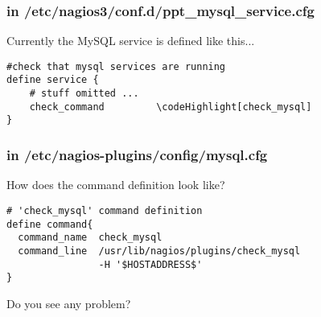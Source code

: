 \documentclass[10pt]{beamer}
\newcommand\codeHighlight[1]{\textcolor[rgb]{1,0,0}{\textbf{#1}}}
\begin{document}
\begin{frame}[fragile]
  \frametitle{in /etc/nagios3/conf.d/ppt\_mysql\_service.cfg}

Currently the MySQL service is defined like this...

\vspace{0.5cm}

\begin{Verbatim}[commandchars=\\\[\]]
#check that mysql services are running
define service {
    # stuff omitted ...
    check_command         \codeHighlight[check_mysql]
}

\end{Verbatim}
\end{frame}


\begin{frame}[fragile]
  \frametitle{in /etc/nagios-plugins/config/mysql.cfg}
  
How does the command definition look like?

\vspace{0.5cm}

\begin{Verbatim}[commandchars=\\\[\]]
# 'check_mysql' command definition
define command{
  command_name  check_mysql
  command_line  /usr/lib/nagios/plugins/check_mysql
                -H '$HOSTADDRESS$' 
}
\end{Verbatim}

\vspace{0.5cm}

Do you see any problem?

\end{frame}
\end{document}
